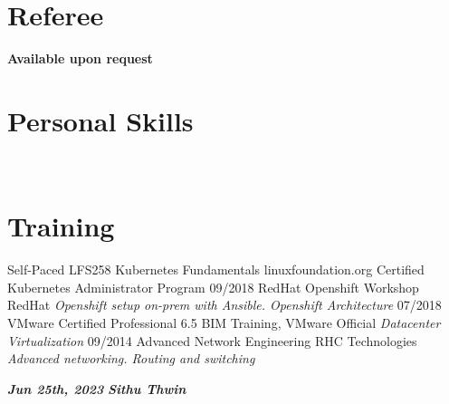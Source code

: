 \documentclass[]{friggeri-cv}
\begin{document}
\begin{aside}
~
~
~
~
  \section{Referee}
    \textbf{Available upon request}
  ~
  \section{Personal Skills}
~
\end{aside}
\section{Training}
\begin{entrylist}
  \entry
  {Self-Paced}
  {LFS258 Kubernetes Fundamentals}
  {linuxfoundation.org}
  {Certified Kubernetes Administrator Program}
  \entry
  {09/2018}
  {RedHat Openshift Workshop}
  {RedHat}
  {\emph{Openshift setup on-prem with Ansible. Openshift Architecture}}	\entry
  {07/2018}
  {VMware Certified Professional 6.5}
  {BIM Training, VMware Official}
  {\emph{Datacenter Virtualization}}
  \entry
  {09/2014}
  {Advanced Network Engineering}
  {RHC Technologies}
  {\emph{Advanced networking. Routing and switching}}
\end{entrylist}

\textbf{\emph{Jun 25th, 2023}}
\hfill
\textbf{\emph{Sithu Thwin}}
\end{document}
